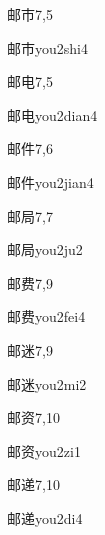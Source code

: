 \begin{entry}{邮市}{7,5}
  \begin{phonetics}{邮市}{you2shi4}
  \end{phonetics}
\end{entry}

\begin{entry}{邮电}{7,5}
  \begin{phonetics}{邮电}{you2dian4}
  \end{phonetics}
\end{entry}

\begin{entry}{邮件}{7,6}
  \begin{phonetics}{邮件}{you2jian4}
  \end{phonetics}
\end{entry}

\begin{entry}{邮局}{7,7}
  \begin{phonetics}{邮局}{you2ju2}
  \end{phonetics}
\end{entry}

\begin{entry}{邮费}{7,9}
  \begin{phonetics}{邮费}{you2fei4}
  \end{phonetics}
\end{entry}

\begin{entry}{邮迷}{7,9}
  \begin{phonetics}{邮迷}{you2mi2}
  \end{phonetics}
\end{entry}

\begin{entry}{邮资}{7,10}
  \begin{phonetics}{邮资}{you2zi1}
  \end{phonetics}
\end{entry}

\begin{entry}{邮递}{7,10}
  \begin{phonetics}{邮递}{you2di4}
  \end{phonetics}
\end{entry}


